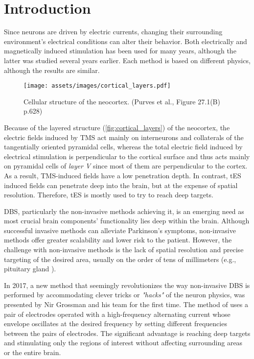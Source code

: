\pagebreak
{}
\chapter{Introduction}

Since neurons are driven by electric currents, changing their surrounding environment's electrical conditions can alter their behavior. Both electrically and magnetically induced stimulation has been used for many years, although the latter was studied several years earlier. Each method is based on different physics, although the results are similar.

\begin{wrapfigure}{l}{0.40\textwidth}
    \centering
    \texttt{[image: assets/images/cortical\_layers.pdf]}
    \caption{Cellular structure of the neocortex. (Purves et al.\cite{Purves2012}, Figure 27.1(B) p.628)}
    \label{fig:cortical_layers}
\end{wrapfigure}

Because of the layered structure (\autoref{fig:cortical_layers}) of the neocortex, the electric fields induced by \gls{TMS} act mainly on interneurons and collaterals of the tangentially oriented pyramidal cells, whereas the total electric field induced by electrical stimulation is perpendicular to the cortical surface and thus acts mainly on pyramidal cells of \textit{layer V} since most of them are perpendicular to the cortex. As a result, \gls{TMS}-induced fields have a low penetration depth. In contrast, \gls{tES} induced fields can penetrate deep into the brain, but at the expense of spatial resolution. Therefore, \gls{tES} is mostly used to try to reach deep targets. 

\gls{DBS}, particularly the non-invasive methods achieving it, is an emerging need as most crucial brain components' functionality lies deep within the brain. Although successful invasive methods can alleviate Parkinson's symptoms, non-invasive methods offer greater scalability and lower risk to the patient. However, the challenge with non-invasive methods is the lack of spatial resolution and precise targeting of the desired area, usually on the order of tens of millimeters (e.g., pituitary gland \cite{Yadav2017_pituitary}).

In 2017, a new method that seemingly revolutionizes the way non-invasive \gls{DBS} is performed by accommodating clever tricks or \textit{"hacks"} of the neuron physics, was presented by Nir Grossman and his team \cite{Grossman2017} for the first time. The method of  uses a pair of electrodes operated with a high-frequency alternating current whose envelope oscillates at the desired frequency by setting different frequencies between the pairs of electrodes. The significant advantage is reaching deep targets and stimulating only the regions of interest without affecting surrounding areas or the entire brain.

